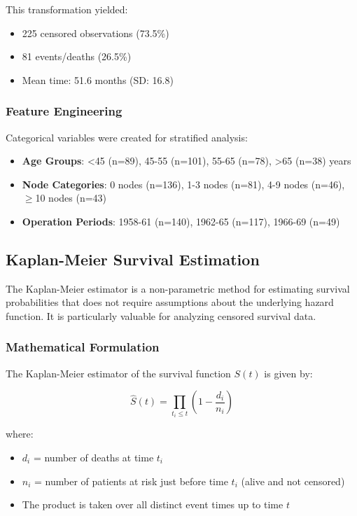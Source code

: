 \documentclass[12pt,a4paper]{article}
\begin{document}
This transformation yielded:
\begin{itemize}
    \item 225 censored observations (73.5\%)
    \item 81 events/deaths (26.5\%)
    \item Mean time: 51.6 months (SD: 16.8)
\end{itemize}

\subsubsection{Feature Engineering}

Categorical variables were created for stratified analysis:

\begin{itemize}
    \item \textbf{Age Groups}: <45 (n=89), 45-55 (n=101), 55-65 (n=78), >65 (n=38) years
    \item \textbf{Node Categories}: 0 nodes (n=136), 1-3 nodes (n=81), 4-9 nodes (n=46), $\geq$10 nodes (n=43)
    \item \textbf{Operation Periods}: 1958-61 (n=140), 1962-65 (n=117), 1966-69 (n=49)
\end{itemize}

\subsection{Kaplan-Meier Survival Estimation}

The Kaplan-Meier estimator is a non-parametric method for estimating survival probabilities that does not require assumptions about the underlying hazard function. It is particularly valuable for analyzing censored survival data.

\subsubsection{Mathematical Formulation}

The Kaplan-Meier estimator of the survival function \(S(t)\) is given by:

\begin{equation}
\hat{S}(t) = \prod_{t_i \leq t} \left(1 - \frac{d_i}{n_i}\right)
\label{eq:km_estimator}
\end{equation}

where:
\begin{itemize}
    \item \(d_i\) = number of deaths at time \(t_i\)
    \item \(n_i\) = number of patients at risk just before time \(t_i\) (alive and not censored)
    \item The product is taken over all distinct event times up to time \(t\)
\end{itemize}
\end{document}

